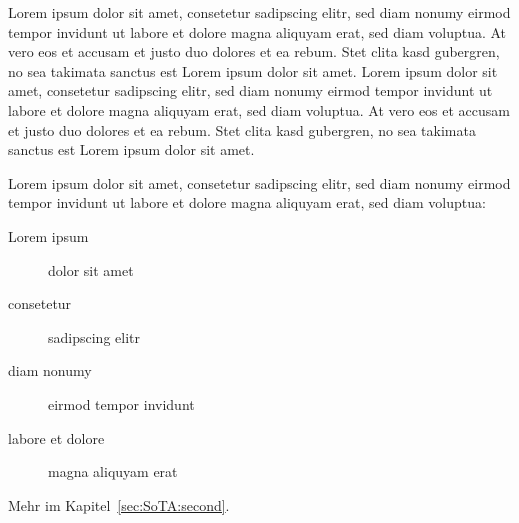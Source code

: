 Lorem ipsum dolor sit amet, consetetur sadipscing elitr, sed diam nonumy eirmod tempor invidunt ut labore et dolore magna aliquyam erat, sed diam voluptua. At vero eos et accusam et justo duo dolores et ea rebum. Stet clita kasd gubergren, no sea takimata sanctus est Lorem ipsum dolor sit amet. Lorem ipsum dolor sit amet, consetetur sadipscing elitr, sed diam nonumy eirmod tempor invidunt ut labore et dolore magna aliquyam erat, sed diam voluptua. At vero eos et accusam et justo duo dolores et ea rebum. Stet clita kasd gubergren, no sea takimata sanctus est Lorem ipsum dolor sit amet.

\begin{samepage}
  Lorem ipsum dolor sit amet, consetetur sadipscing elitr, sed diam nonumy eirmod tempor invidunt ut labore et dolore magna aliquyam erat, sed diam voluptua:
  \begin{description}
    \item[Lorem ipsum] dolor sit amet
    \item[consetetur] sadipscing elitr
    \item[diam nonumy] eirmod tempor invidunt
    \item[labore et dolore] magna aliquyam erat
  \end{description}
\end{samepage}

Mehr im Kapitel~\ref{sec:SoTA:second}.